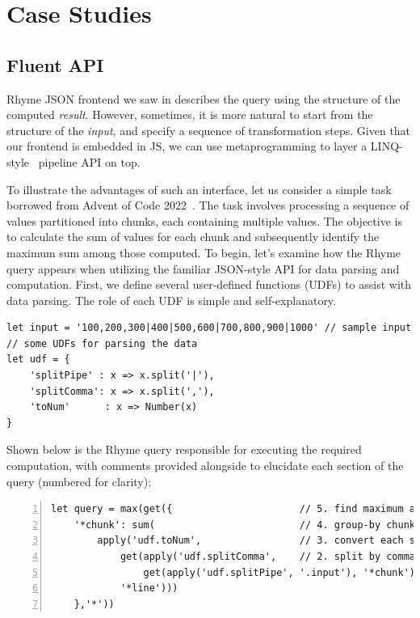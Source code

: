 \documentclass[runningheads]{llncs}
\newcommand{\lang}{Rhyme}
\begin{document}
\section{Case Studies}\label{sec:case_studies}
\subsection{Fluent API}\label{subsec:fluent}
\lang{} JSON frontend we saw in  describes the query
using the structure of the computed \emph{result}.
However, sometimes, it is more natural to start from the structure of the 
\emph{input}, and specify a sequence of transformation steps.
Given that our frontend is embedded in JS, we can use metaprogramming to
layer a LINQ-style~\cite{linq_sigmod} pipeline API on top.

To illustrate the advantages of such an interface, let us consider a
simple task borrowed from Advent of Code 2022~\cite{adventofcode22}.
The task involves processing a sequence of values partitioned into chunks,
each containing multiple values.
The objective is to calculate the sum of values for each chunk and
subsequently identify the maximum sum among those computed.
To begin, let's examine how the \lang{} query appears when utilizing
the familiar JSON-style API for data parsing and computation.
First, we define several user-defined functions (UDFs) to assist with data parsing.
The role of each UDF is simple and self-explanatory.

\begin{lstlisting}[style=JavaScript, columns=flexible]
let input = '100,200,300|400|500,600|700,800,900|1000' // sample input
// some UDFs for parsing the data
let udf = {
    'splitPipe' : x => x.split('|'),
    'splitComma': x => x.split(','),
    'toNum'      : x => Number(x)
}
\end{lstlisting}

Shown below is the \lang{} query responsible for executing the required
computation, with comments provided alongside to elucidate each section
of the query (numbered for clarity):

\begin{lstlisting}[style=JavaScript, columns=flexible, numbers=left]
let query = max(get({                      // 5. find maximum among group sums
    '*chunk': sum(                         // 4. group-by chunk and compute sum
        apply('udf.toNum',                 // 3. convert each string number to a number object
            get(apply('udf.splitComma',    // 2. split by comma to get numbers of each chunk
                get(apply('udf.splitPipe', '.input'), '*chunk')), // 1. split into chunks
            '*line')))
    },'*'))
\end{lstlisting}
\end{document}
